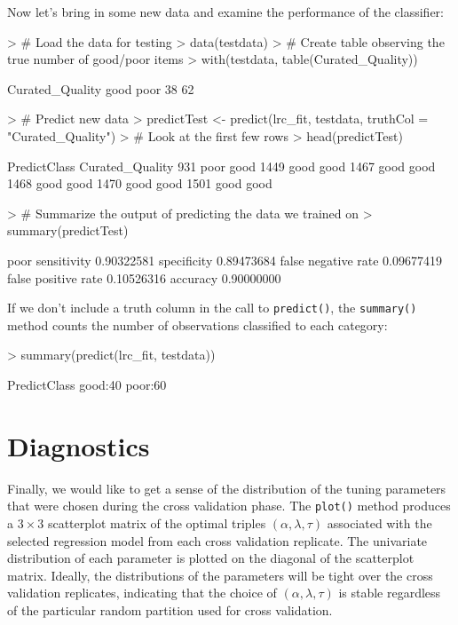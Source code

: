 \documentclass{article}
\begin{document}
\noindent Now let's bring in some new data and examine the performance of the classifier:
\begin{Schunk}
\begin{Sinput}
> # Load the data for testing
> data(testdata)
> # Create table observing the true number of good/poor items 
> with(testdata, table(Curated_Quality))
\end{Sinput}
\begin{Soutput}
Curated_Quality
good poor 
  38   62 
\end{Soutput}
\begin{Sinput}
> # Predict new data
> predictTest <- predict(lrc_fit, testdata, truthCol = "Curated_Quality")
> # Look at the first few rows
> head(predictTest)
\end{Sinput}
\begin{Soutput}
     PredictClass Curated_Quality
931          poor            good
1449         good            good
1467         good            good
1468         good            good
1470         good            good
1501         good            good
\end{Soutput}
\begin{Sinput}
> # Summarize the output of predicting the data we trained on 
> summary(predictTest)
\end{Sinput}
\begin{Soutput}
                          poor
sensitivity         0.90322581
specificity         0.89473684
false negative rate 0.09677419
false positive rate 0.10526316
accuracy            0.90000000
\end{Soutput}
\end{Schunk}
\noindent If we don't include a truth column in the call to {\tt predict()}, the {\tt summary()} method 
counts the number of observations classified to each category:
\begin{Schunk}
\begin{Sinput}
> summary(predict(lrc_fit, testdata))
\end{Sinput}
\begin{Soutput}
 PredictClass
 good:40     
 poor:60     
\end{Soutput}
\end{Schunk}


\section{Diagnostics}

\noindent Finally, we would like to get a sense of the distribution of the tuning parameters that were chosen 
during the cross validation phase. The {\tt plot()} method produces a $3 \times 3$ scatterplot matrix of the optimal 
triples $\left(\alpha, \lambda, \tau\right)$ associated with the selected regression model from each cross 
validation replicate. The univariate distribution of each parameter is plotted on the diagonal of the 
scatterplot matrix.  Ideally, the distributions of the parameters will be tight over the cross validation 
replicates, indicating that the choice of $\left(\alpha, \lambda, \tau\right)$ is stable regardless of
the particular random partition used for cross validation.
\end{document}
